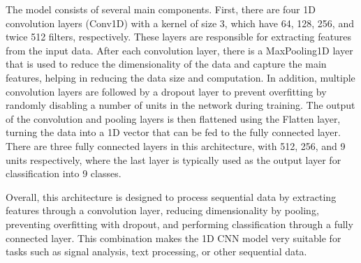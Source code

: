 The model consists of several main components. First, there are four 1D convolution layers (Conv1D) with a kernel of size 3, which have 64, 128, 256, and twice 512 filters, respectively. These layers are responsible for extracting features from the input data. After each convolution layer, there is a MaxPooling1D layer that is used to reduce the dimensionality of the data and capture the main features, helping in reducing the data size and computation. In addition, multiple convolution layers are followed by a dropout layer to prevent overfitting by randomly disabling a number of units in the network during training. The output of the convolution and pooling layers is then flattened using the Flatten layer, turning the data into a 1D vector that can be fed to the fully connected layer. There are three fully connected layers in this architecture, with 512, 256, and 9 units respectively, where the last layer is typically used as the output layer for classification into 9 classes.

Overall, this architecture is designed to process sequential data by extracting features through a convolution layer, reducing dimensionality by pooling, preventing overfitting with dropout, and performing classification through a fully connected layer. This combination makes the 1D CNN model very suitable for tasks such as signal analysis, text processing, or other sequential data.


